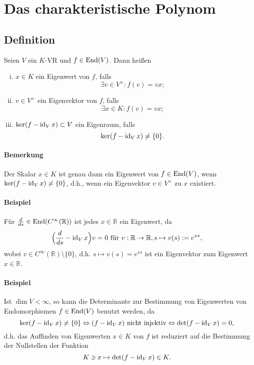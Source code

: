\section{Das charakteristische Polynom}
\subsection{Definition}
	Seien $ V $ ein $ K $-VR und $ f\in\operatorname{End}(V) $. Dann heißen
		\begin{enumerate}[(i)]
			\item $ x\in K $ ein Eigenwert von $ f $, falls
				\[ \exists v\in V^\times: f(v)=vx; \]
			\item $ v\in V^\times $ ein Eigenvektor von $ f $, falls
				\[ \exists x\in K:f(v)=vx; \]
			\item $ \ker(f-\operatorname{id}_Vx) \subset V $ ein Eigenraum, falls
				\[ \ker(f-\operatorname{id}_Vx) \neq \{0\}.\]
		\end{enumerate}
\paragraph{Bemerkung}
	Der Skalar $ x\in K $ ist genau dann ein Eigenwert von $ f\in \operatorname{End}(V) $, wenn $ \ker(f-\operatorname{id}_Vx)\neq \{0\} $, d.h., wenn ein Eigenvektor $ v\in V^\times $ zu $ x $ existiert.
\paragraph{Beispiel}
	Für $ \frac{d}{ds} \in \operatorname{End}(C^\infty(\mathbb{R}))$ ist jedes $ x\in \mathbb{R} $ ein Eigenwert, da
		\[ \Big(\frac{d}{ds}-\operatorname{id}_Vx\Big)v = 0 \text{ für } v:\mathbb{R}\to\mathbb{R},s\mapsto v(s):= e^{xs}, \]
	wobei $ v\in C^\infty(\mathbb{R})\setminus \{0\} $, d.h. $ s\mapsto v(s)=e^{xs} $ ist ein Eigenvektor zum Eigenwert $ x\in\mathbb{R} $.
\paragraph{Beispiel}
	Ist $ \dim V < \infty $, so kann die Determinante zur Bestimmung von Eigenwerten von Endomorphismen $ f\in\operatorname{End}(V) $ benutzt werden, da
		\[ \ker(f-\operatorname{id}_Vx)\neq \{0\} \Leftrightarrow (f-\operatorname{id}_Vx) \text{ nicht injektiv}\Leftrightarrow \det(f-\operatorname{id}_Vx) = 0, \]
	d.h. das Auffinden von Eigenwerten $ x\in K $ von $ f $ ist reduziert auf die Bestimmung der Nullstellen der Funktion
		\[ K\ni x\mapsto \det(f-\operatorname{id}_Vx)\in K. \]
		
